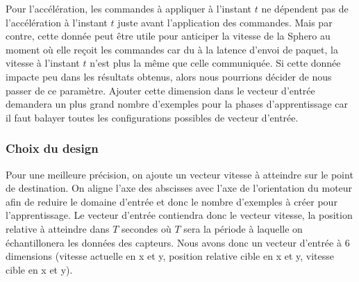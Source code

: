 Pour l'accélération, les commandes à appliquer à l'instant $t$ ne dépendent pas de l'accélération à l'instant $t$ juste avant l'application des commandes.
Mais par contre, cette donnée peut être utile pour anticiper la vitesse de la Sphero au moment où elle reçoit les commandes car du à la latence d'envoi de paquet, la vitesse à l'instant $t$ n'est plus la même que celle communiquée.
Si cette donnée impacte peu dans les résultats obtenus, alors nous pourrions décider de nous passer de ce paramètre.
Ajouter cette dimension dans le vecteur d'entrée demandera un plus grand nombre d'exemples pour la phases d'apprentissage car il faut balayer toutes les configurations possibles de vecteur d'entrée.

\newcommand{\inchist}[1]{
 \begin{minipage}{0.48\textwidth}
  \texttt{[image: ../figures/hist\#1.jpeg]}
 \end{minipage}
}
\subsubsection{Choix du design}\label{sec:choixdesign}
Pour une meilleure précision, on ajoute un vecteur vitesse à atteindre sur le point de destination.
On aligne l'axe des abscisses avec l'axe de l'orientation du moteur afin de reduire le domaine d'entrée et donc le nombre d'exemples à créer pour l'apprentissage.
Le vecteur d'entrée contiendra donc le vecteur vitesse, la position relative à atteindre dans $T$ secondes où $T$ sera la période à laquelle on échantillonera les données des capteurs.
Nous avons donc un vecteur d'entrée à 6 dimensions (vitesse actuelle en x et y, position relative cible en x et y, vitesse cible en x et y).

